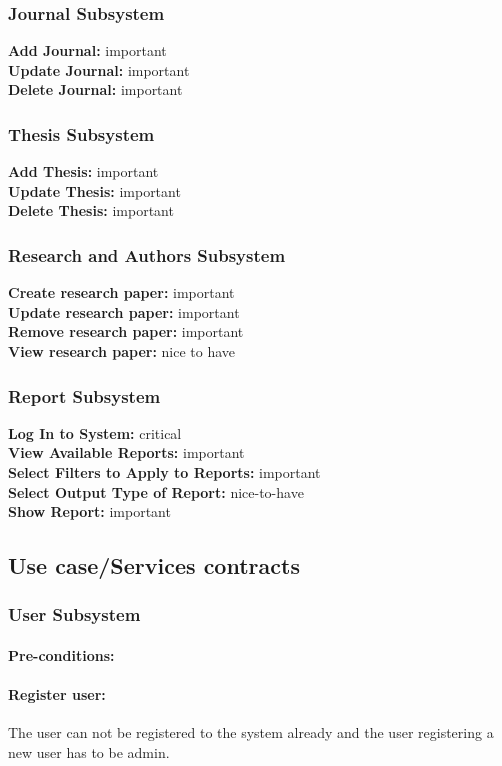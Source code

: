 \documentclass{article}
\begin{document}
			\subsubsection{Journal Subsystem}
				\textbf{Add Journal:} important\\
				\textbf{Update Journal:} important\\
				\textbf{Delete Journal:} important
			\subsubsection{Thesis Subsystem}
				\textbf{Add Thesis:} important\\
				\textbf{Update Thesis:} important\\
				\textbf{Delete Thesis:} important
			\subsubsection{Research and Authors Subsystem}
				\textbf{Create research paper:} important\\
				\textbf{Update research paper:} important\\
				\textbf{Remove research paper:} important\\
				\textbf{View research paper:} nice to have\\
			\subsubsection{Report Subsystem}
				\textbf{Log In to System:} critical\\
				\textbf{View Available Reports:} important\\
				\textbf{Select Filters to Apply to Reports:} important\\
				\textbf{Select Output Type of Report:} nice-to-have\\
				\textbf{Show Report:} important\\
		\subsection{Use case/Services contracts}
			\subsubsection{User Subsystem}
				\paragraph{Pre-conditions:}
				\paragraph{Register user:} The user can not be registered to the system already and the user registering a new user has to be admin.
\end{document}

